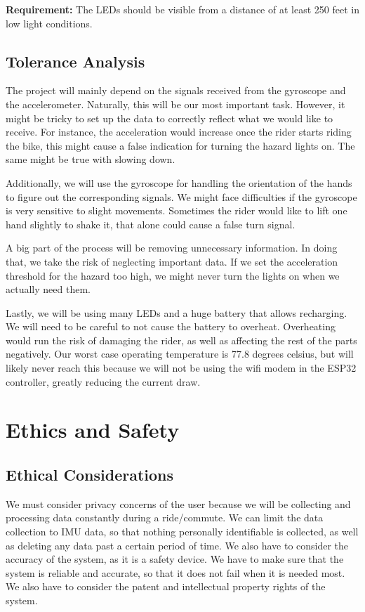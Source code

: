 \documentclass[12pt]{article}
\begin{document}
\textbf{Requirement:} The LEDs should be visible from a distance of at least 250 feet in low light conditions. 


\subsection{Tolerance Analysis}
The project will mainly depend on the signals received from the 
gyroscope and the accelerometer. Naturally, this will be our most 
important task. However, it might be tricky to set up the data to 
correctly reflect what we would like to receive. For instance, 
the acceleration would increase once the rider starts riding the 
bike, this might cause a false indication for turning the hazard 
lights on. The same might be true with slowing down. 

Additionally, we will use the gyroscope for handling the 
orientation of the hands to figure out the corresponding signals. 
We might face difficulties if the gyroscope is very sensitive to 
slight movements. Sometimes the rider would like to lift one hand 
slightly to shake it, that alone could cause a false turn signal. 

A big part of the process will be removing unnecessary information. 
In doing that, we take the risk of neglecting important data. 
If we set the acceleration threshold for the hazard too high, 
we might never turn the lights on when we actually need them. 

Lastly, we will be using many LEDs and a huge battery that allows 
recharging. We will need to be careful to not cause the battery to 
overheat. Overheating would run the risk of damaging the 
rider, as well as affecting the rest of the parts negatively. Our worst case operating temperature is 77.8 degrees 
celsius, but will likely never reach this because we will not 
be using the wifi modem in the ESP32 controller, greatly reducing 
the current draw. 

\section{Ethics and Safety}
\subsection{Ethical Considerations}
We must consider privacy concerns of the user because we will 
be collecting and processing data constantly during a 
ride/commute. We can limit the data collection to IMU data, 
so that nothing personally identifiable is collected, as well 
as deleting any data past a certain period of time. We also
have to consider the accuracy of the system, as it is a safety
device. We have to make sure that the system is reliable and
accurate, so that it does not fail when it is needed most.
We also have to consider the patent and intellectual property
rights of the system.
\end{document}
